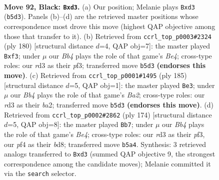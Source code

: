\documentclass[11pt]{article}
\begin{document}
\clearpage

\begin{figure}[p]\centering
\begin{subfigure}{0.46\textwidth}\centering
\resizebox{\linewidth}{!}{%
\newchessgame
\chessboard[
  setfen={8/5k2/8/1b3p2/5P2/3R4/7K/8 b - - 0 92},
  showmover=false,
  pgfstyle=straightmove, color=movearrow, markmove={b5-d3}
]}
\caption{}
\end{subfigure}\hfill
\begin{subfigure}{0.46\textwidth}\centering
\resizebox{\linewidth}{!}{%
\newchessgame
\chessboard[
  setfen={8/4k3/8/2K3pP/4B3/5p2/8/8 w - - 0 91},
  showmover=false,
  pgfstyle=straightmove, color=movearrow, markmove={e4-f3}
]}
\caption{}
\end{subfigure}
\\[4pt]
\begin{subfigure}{0.46\textwidth}\centering
\resizebox{\linewidth}{!}{%
\newchessgame
\chessboard[
  setfen={3k4/b7/8/4p3/8/5P2/B7/4K3 b - - 8 93},
  showmover=false,
  pgfstyle=straightmove, color=movearrow, markmove={a7-e3}
]}
\caption{}
\end{subfigure}\hfill
\begin{subfigure}{0.46\textwidth}\centering
\resizebox{\linewidth}{!}{%
\newchessgame
\chessboard[
  setfen={3b4/8/3k4/1P6/4B3/5p2/8/K7 w - - 2 88},
  showmover=false,
  pgfstyle=straightmove, color=movearrow, markmove={e4-b7}
]}
\caption{}
\end{subfigure}
\caption{\textbf{Move 92, Black: \texttt{Bxd3}.} (a) Our position; Melanie plays \texttt{Bxd3} (\texttt{b5d3}). Panels (b)--(d) are the retrieved master positions whose correspondence most drove this move (highest QAP objective among those that transfer to it). (b) Retrieved from \texttt{ccrl\_top\_p0003\#2324} (ply 180) [structural distance $d$=4, QAP obj=7]: the master played \texttt{Bxf3}; under $\mu$ our \emph{Bb4} plays the role of that game's \emph{Be4}; cross-type roles: our \emph{r}d3 as their \emph{p}f3; transferred move \texttt{b5d3} \textbf{(endorses this move)}. (c) Retrieved from \texttt{ccrl\_top\_p0001\#1495} (ply 185) [structural distance $d$=5, QAP obj=1]: the master played \texttt{Be3}; under $\mu$ our \emph{Bb4} plays the role of that game's \emph{Ba2}; cross-type roles: our \emph{r}d3 as their \emph{b}a2; transferred move \texttt{b5d3} \textbf{(endorses this move)}. (d) Retrieved from \texttt{ccrl\_top\_p0002\#2862} (ply 174) [structural distance $d$=5, QAP obj=8]: the master played \texttt{Bb7}; under $\mu$ our \emph{Bb4} plays the role of that game's \emph{Be4}; cross-type roles: our \emph{r}d3 as their \emph{p}f3, our \emph{p}f4 as their \emph{b}d8; transferred move \texttt{b5a4}. Synthesis: 3 retrieved analogs transferred to \texttt{Bxd3} (summed QAP objective 9, the strongest correspondence among the candidate moves); Melanie committed it via the \texttt{search} selector.}
\label{fig:thought-m183}
\end{figure}
\end{document}
